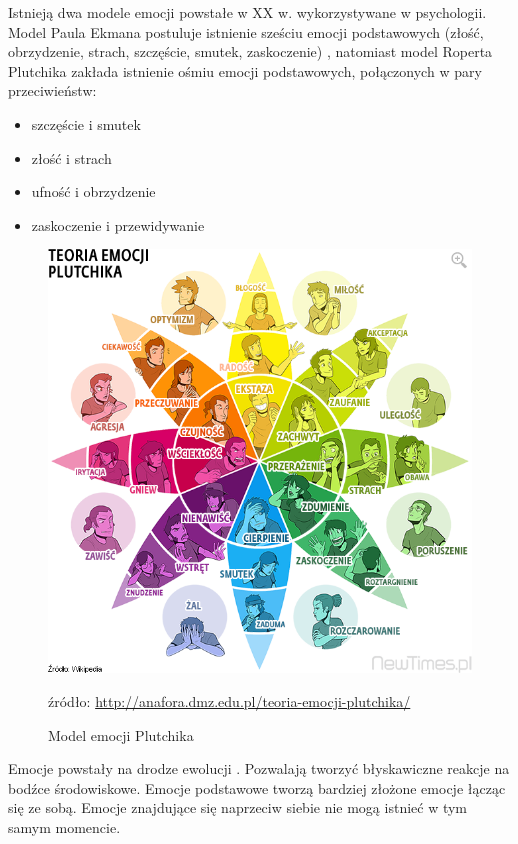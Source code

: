 \documentclass[a4paper,12pt,twoside,openany]{report}
\newcommand{\zrodlo}[1]{\caption*{źródło: \url{#1}}}
\begin{document}
Istnieją dwa modele emocji powstałe w XX w. wykorzystywane w psychologii.
Model Paula Ekmana postuluje istnienie sześciu emocji podstawowych (złość, obrzydzenie, strach, szczęście, smutek, zaskoczenie) \cite{Eisner2015},
natomiast model Roperta Plutchika zakłada istnienie ośmiu emocji podstawowych, połączonych w pary przeciwieństw:
\begin{itemize}
	\item szczęście i smutek
	\item złość i strach
	\item ufność i obrzydzenie
	\item zaskoczenie i przewidywanie
\end{itemize}
\begin{figure}[h]
	\centering
	\includegraphics[width=\textwidth]{Plutchik-Emotions-Wheel}
	\caption{Model emocji Plutchika}
	\zrodlo{http://anafora.dmz.edu.pl/teoria-emocji-plutchika/}
	\label{rys:intro:plutnik}
\end{figure}
Emocje powstały na drodze ewolucji \cite{Plutchik2001}.
Pozwalają tworzyć błyskawiczne reakcje na bodźce środowiskowe.
Emocje podstawowe tworzą bardziej złożone emocje łącząc się ze sobą.
Emocje znajdujące się naprzeciw siebie nie mogą istnieć w tym samym momencie. 
\end{document}
